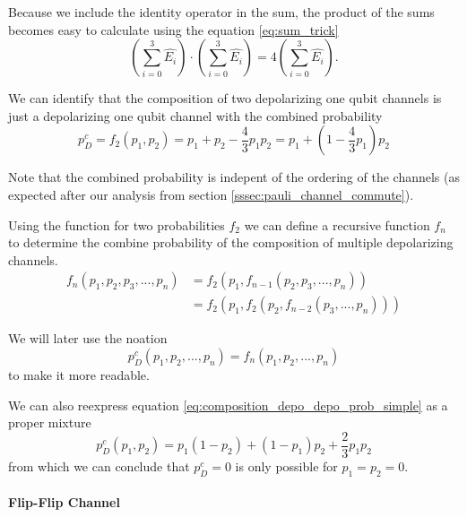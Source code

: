 Because we include the identity operator in the sum, the product of the sums becomes easy to calculate using the equation \ref{eq:sum_trick} 
\begin{equation*}
    \left( \sum_{i=0}^{3} \hat{E_i}\right) \cdot \left( \sum_{i=0}^{3} \hat{E_i}\right) = 4 \left( \sum_{i=0}^{3} \hat{E_i}\right) .
\end{equation*}

We can identify that the composition of two depolarizing one qubit channels 
is just a depolarizing one qubit channel with the combined probability 
\begin{equation}
    p^c_D = f_{2}(p_1,p_2) = p_1 + p_2 - \frac{4}{3}p_1 p_2 = p_1 + (1- \frac{4}{3}p_1) p_2
    \label{eq:composition_depo_depo_prob_simple}
\end{equation}

Note that the combined probability is indepent of the ordering of the channels (as expected after our analysis from section \ref{sssec:pauli_channel_commute}).

Using the function for two probabilities $f_{2}$ we can define a recursive function $f_{n}$ to determine the combine probability of the composition of multiple depolarizing channels.
\begin{align*}
    f_{n}(p_1,p_2,p_3,...,p_n) &= f_{2}\left(p_1,f_{n-1}(p_2,p_3,...,p_n)\right) \\
    &= f_{2}(p_1,f_{2}(p_2,f_{n-2}(p_3,...,p_n)))
\end{align*} 

We will later use the noation
\begin{equation}
    p_D^c(p_1,p_2,...,p_n) = f_{n}(p_1,p_2,...,p_n)
    \label{eq:depo_depo_composition}
\end{equation}
to make it more readable.

We can also reexpress equation \ref{eq:composition_depo_depo_prob_simple} as a proper mixture 
\begin{equation}
    p^c_D(p_1,p_2) = p_1 (1-p_2) + (1-p_1) p_2 + \frac{2}{3} p_1 p_2
\end{equation}
from which we can conclude that $p^c_D=0$ is only possible for $p_1=p_2=0$.


\paragraph{Flip-Flip Channel}

